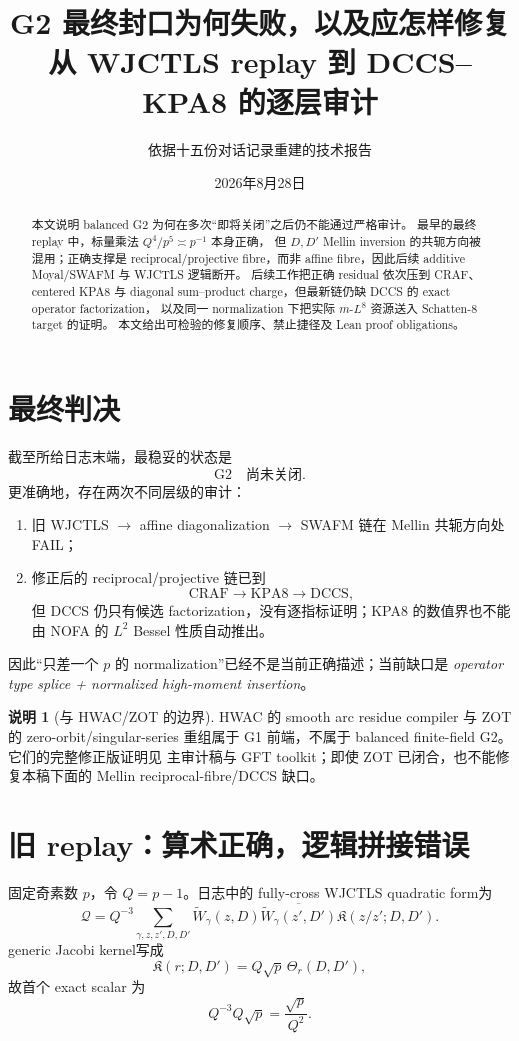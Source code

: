 \documentclass[11pt,a4paper]{ctexart}
\title{G2 最终封口为何失败，以及应怎样修复\\
\large 从 WJCTLS replay 到 DCCS--KPA8 的逐层审计}
\author{依据十五份对话记录重建的技术报告}
\date{2026年8月28日}
\theoremstyle{definition}
\newtheorem{remark}[theorem]{说明}
\newcommand{\1}{\mathbf 1}
\newcommand{\FAIL}{\textcolor{red!70!black}{\textsf{FAIL}}}
\begin{document}
\maketitle
\sloppy

\begin{abstract}
本文说明 balanced G2 为何在多次“即将关闭”之后仍不能通过严格审计。
最早的最终 replay 中，标量乘法 $Q^4/p^5\asymp p^{-1}$ 本身正确，
但 $D,D'$ Mellin inversion 的共轭方向被混用；正确支撑是 reciprocal/projective
fibre，而非 affine fibre，因此后续 additive Moyal/SWAFM 与 WJCTLS 逻辑断开。
后续工作把正确 residual 依次压到 CRAF、centered KPA8 与 diagonal
sum--product charge，但最新链仍缺 DCCS 的 exact operator factorization，
以及同一 normalization 下把实际 $m$-$L^8$ 资源送入 Schatten-$8$ target 的证明。
本文给出可检验的修复顺序、禁止捷径及 Lean proof obligations。
\end{abstract}

\section{最终判决}

截至所给日志末端，最稳妥的状态是
\[
\boxed{\mathrm{G2}\quad\textbf{尚未关闭}.}
\]
更准确地，存在两次不同层级的审计：
\begin{enumerate}
\item 旧 WJCTLS $\to$ affine diagonalization $\to$ SWAFM 链在 Mellin
共轭方向处 \FAIL；
\item 修正后的 reciprocal/projective 链已到
\[
\mathrm{CRAF}\to\mathrm{KPA8}\to\mathrm{DCCS},
\]
但 DCCS 仍只有候选 factorization，没有逐指标证明；KPA8 的数值界也不能由
NOFA 的 $L^2$ Bessel 性质自动推出。
\end{enumerate}
因此“只差一个 $p$ 的 normalization”已经不是当前正确描述；当前缺口是
\emph{operator type splice + normalized high-moment insertion}。

\begin{remark}[与 HWAC/ZOT 的边界]
HWAC 的 smooth arc residue compiler 与 ZOT 的 zero-orbit/singular-series
重组属于 G1 前端，不属于 balanced finite-field G2。它们的完整修正版证明见
主审计稿与 GFT toolkit；即使 ZOT 已闭合，也不能修复本稿下面的 Mellin
reciprocal-fibre/DCCS 缺口。
\end{remark}

\section{旧 replay：算术正确，逻辑拼接错误}

固定奇素数 $p$，令 $Q=p-1$。日志中的 fully-cross WJCTLS quadratic form为
\[
\mathcal Q
=Q^{-3}\sum_{\gamma,z,z',D,D'}
\widetilde W_\gamma(z,D)
\overline{\widetilde W_\gamma(z',D')}
\mathfrak K(z/z';D,D').
\tag{2.1}
\]
generic Jacobi kernel写成
\[
\mathfrak K(r;D,D')=Q\sqrt p\,\Theta_r(D,D'),
\]
故首个 exact scalar 为
\[
Q^{-3}Q\sqrt p=\frac{\sqrt p}{Q^2}.
\tag{2.2}
\]
\end{document}
